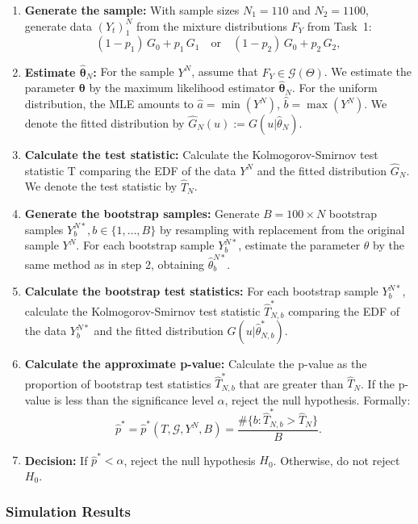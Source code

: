 \documentclass{article}
\begin{document}
\begin{enumerate}
    \item \textbf{Generate the sample:} With sample sizes \(N_1 = 110\) and \(N_2 = 1100\), generate data \((Y_t)_{1}^N\) from the mixture distributions \(F_Y\) from Task~1:
    \[
      (1 - p_1) \, G_0 + p_1 \, G_1  
      \quad\text{or}\quad  
      (1 - p_2) \, G_0 + p_2 \, G_2,
    \]  
    \item \textbf{Estimate \(\hat{\boldsymbol{\theta}}_N\):} For the sample \(Y^N\), assume that \(F_Y \in \mathcal{G}(\Theta)\). We estimate the parameter \(\boldsymbol{\theta}\) by the maximum likelihood estimator \(\hat{\boldsymbol{\theta}}_N\). For the uniform distribution, the MLE amounts to \(\hat{a} = \min(Y^N)\), \(\hat{b} = \max(Y^N)\). We denote the fitted distribution by \(\hat{G}_N(u) := G(u|\hat{\theta}_N)\).
    \item \textbf{Calculate the test statistic:} Calculate the Kolmogorov-Smirnov test statistic T comparing the EDF of the data \(Y^N\) and the fitted distribution \(\hat{G}_N\). We denote the test statistic by \(\hat{T}_N\).
    \item \textbf{Generate the bootstrap samples:} Generate \(B = 100 \times N\) bootstrap samples \( Y^{N*}_b, b \in \{1, \ldots, B\} \) by resampling with replacement from the original sample \(Y^N\). For each bootstrap sample \(Y^{N*}_b\), estimate the parameter \(\theta\) by the same method as in step 2, obtaining \(\hat{\theta}^{N*}_b\).
    \item \textbf{Calculate the bootstrap test statistics:} For each bootstrap sample \(Y^{N*}_b\), calculate the Kolmogorov-Smirnov test statistic \(\hat{T}^*_{N,b}\) comparing the EDF of the data \(Y^{N*}_b\) and the fitted distribution \(G(u|\hat{\theta}^*_{N,b})\).
    \item \textbf{Calculate the approximate p-value:} Calculate the p-value as the proportion of bootstrap test statistics \(\hat{T}^*_{N,b}\) that are greater than \(\hat{T}_N\). If the p-value is less than the significance level \(\alpha\), reject the null hypothesis. Formally:
    \[
        \hat{p}^* = \hat{p}^*(T, \mathcal{G}, Y^N, B) = \frac{\#\{b: \hat{T}^*_{N,b} > \hat{T}_N\}}{B}.
    \]
    \item \textbf{Decision:} If \(\hat{p}^* < \alpha\), reject the null hypothesis \(H_0\). Otherwise, do not reject \(H_0\).
\end{enumerate}

\subsubsection{Simulation Results}
\end{document}

